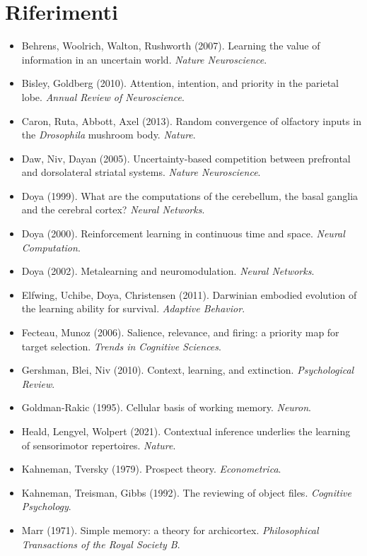 \documentclass[11pt,a4paper]{article}
\begin{document}
\section*{Riferimenti}
\small
\begin{itemize}[leftmargin=1em,itemsep=1pt]
\item Behrens, Woolrich, Walton, Rushworth (2007). Learning the value of information in an uncertain world. \emph{Nature Neuroscience}.
\item Bisley, Goldberg (2010). Attention, intention, and priority in the parietal lobe. \emph{Annual Review of Neuroscience}.
\item Caron, Ruta, Abbott, Axel (2013). Random convergence of olfactory inputs in the \emph{Drosophila} mushroom body. \emph{Nature}.
\item Daw, Niv, Dayan (2005). Uncertainty-based competition between prefrontal and dorsolateral striatal systems. \emph{Nature Neuroscience}.
\item Doya (1999). What are the computations of the cerebellum, the basal ganglia and the cerebral cortex? \emph{Neural Networks}.
\item Doya (2000). Reinforcement learning in continuous time and space. \emph{Neural Computation}.
\item Doya (2002). Metalearning and neuromodulation. \emph{Neural Networks}.
\item Elfwing, Uchibe, Doya, Christensen (2011). Darwinian embodied evolution of the learning ability for survival. \emph{Adaptive Behavior}.
\item Fecteau, Munoz (2006). Salience, relevance, and firing: a priority map for target selection. \emph{Trends in Cognitive Sciences}.
\item Gershman, Blei, Niv (2010). Context, learning, and extinction. \emph{Psychological Review}.
\item Goldman-Rakic (1995). Cellular basis of working memory. \emph{Neuron}.
\item Heald, Lengyel, Wolpert (2021). Contextual inference underlies the learning of sensorimotor repertoires. \emph{Nature}.
\item Kahneman, Tversky (1979). Prospect theory. \emph{Econometrica}.
\item Kahneman, Treisman, Gibbs (1992). The reviewing of object files. \emph{Cognitive Psychology}.
\item Marr (1971). Simple memory: a theory for archicortex. \emph{Philosophical Transactions of the Royal Society B}.

\end{itemize}
\end{document}
